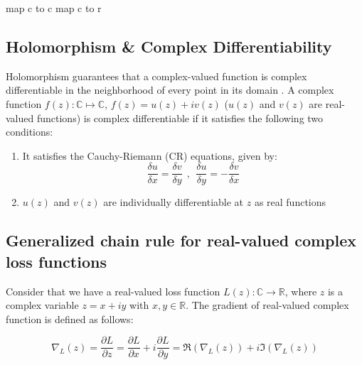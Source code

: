 
map c to c
map c to r



\subsection{Holomorphism \& Complex Differentiability}

Holomorphism guarantees that a complex-valued function is complex differentiable in the neighborhood of every point in its domain \cite{trabelsi2018deep}.
A complex function $f(z): \mathbb{C} \mapsto \mathbb{C}$, $f(z)= u(z) + iv(z)$ ($u(z)$ and $v(z)$ are real-valued functions) is complex differentiable if it satisfies the following two conditions:
\begin{enumerate}

	\item It satisfies the Cauchy-Riemann (CR) equations, given by:
\begin{equation}\label{eq:compdiff}
\frac{\delta u}{\delta x} = \frac{\delta v}{\delta y} ~~,~~ \frac{\delta u}{\delta y} = - \frac{\delta v}{\delta x} 
\end{equation}
	\item $u(z)$ and $v(z)$ are individually differentiable at $z$ as real functions	
\end{enumerate} 

\subsection{Generalized chain rule for real-valued complex loss  functions}\label{cchainrule}
Consider that we have a real-valued loss function $L(z): \mathbb{C}\rightarrow\mathbb{R}$, where $z$ is a complex variable $z=x+iy$ with $x,y \in \mathbb{R}$. The gradient of real-valued complex function is defined as follows:
 
\begin{equation}\label{cvgrad}
\nabla_{L}(z) = \frac{\partial L}{\partial z} = \frac{\partial L}{\partial x} + i\frac{\partial L}{\partial y} = \Re(\nabla_{L}(z))+i\Im(\nabla_{L}(z))
\end{equation}

